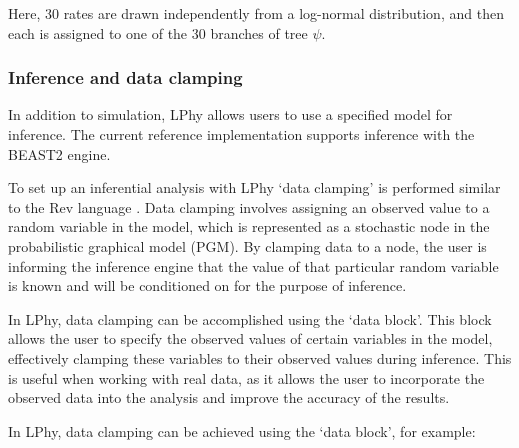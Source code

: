 \documentclass[10pt,letterpaper,table]{article}
\theoremstyle{definition}
\begin{document}
Here, 30 rates are drawn independently from a log-normal distribution, and then each is assigned to one of the 30 branches of tree $\psi$.

\subsubsection{Inference and data clamping}
\label{sec:dataclamping}
In addition to simulation, LPhy allows users to use a specified model for inference. 
The current reference implementation supports inference with the BEAST2 engine. 

To set up an inferential analysis with LPhy `data clamping' is performed similar to the Rev language \cite{revbayes}.
Data clamping involves assigning an observed value to a random variable in the model, which is represented as a stochastic node in the probabilistic graphical model (PGM). 
By clamping data to a node, the user is informing the inference engine that the value of that particular random variable is known and will be conditioned on for the purpose of inference.

In LPhy, data clamping can be accomplished using the `data block'. 
This block allows the user to specify the observed values of certain variables in the model, effectively clamping these variables to their observed values during inference. 
This is useful when working with real data, as it allows the user to incorporate the observed data into the analysis and improve the accuracy of the results.

In LPhy, data clamping can be achieved using the `data block', for example:
\end{document}
